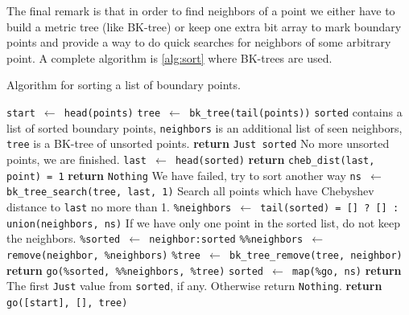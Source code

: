 \documentclass[reprint,amsmath,amssymb,aps,pre,showkeys,showpacs]{revtex4-1}
\begin{document}
The final remark is that in order to find neighbors of a point we either have to
build a metric tree (like BK-tree) or keep one extra bit array to mark boundary
points and provide a way to do quick searches for neighbors of some arbitrary
point. A complete algorithm is \cref{alg:sort} where BK-trees are used.
\begin{algorithm}[H]
  \caption{Algorithm for sorting a list of boundary points.}
  \label{alg:sort}
  \begin{algorithmic}[1]
    \State \texttt{start $\gets$ head(points)}
    \State \texttt{tree $\gets$ bk\_tree(tail(points))}
    \Comment \texttt{sorted} contains a list of sorted boundary points,
    \texttt{neighbors} is an additional list of seen neighbors, \texttt{tree} is
    a BK-tree of unsorted points.
    \State \textbf{return} \texttt{Just sorted}
    \Comment No more unsorted points, we are finished.
    \EndIf
    \State \texttt{last $\gets$ head(sorted)}
    \State \textbf{return} \texttt{cheb\_dist(last, point) = 1}
    \EndProcedure
    \State \textbf{return} \texttt{Nothing}
    \Comment We have failed, try to sort another way
    \EndIf
    \State \texttt{ns $\gets$ bk\_tree\_search(tree, last, 1)}
    \Comment Search all points which have Chebyshev distance to \texttt{last} no
    more than 1.
    \State \texttt{\%neighbors $\gets$ tail(sorted) = [] ? [] : union(neighbors, ns)}
    \Comment If we have only one point in the sorted list, do not keep the
    neighbors.
    \State \texttt{\%sorted $\gets$ neighbor:sorted}
    \State \texttt{\%\%neighbors $\gets$ remove(neighbor, \%neighbors)}
    \State \texttt{\%tree $\gets$ bk\_tree\_remove(tree, neighbor)}
    \State \textbf{return} \texttt{go(\%sorted, \%\%neighbors, \%tree)}
    \EndProcedure
    \State \texttt{sorted $\gets$ map(\%go, ns)}
    \State \textbf{return} The first \texttt{Just} value from \texttt{sorted},
    if any. Otherwise return \texttt{Nothing}.
    \EndProcedure
    \State \textbf{return} \texttt{go([start], [], tree)}
    \EndProcedure
  \end{algorithmic}
\end{algorithm}
\end{document}
